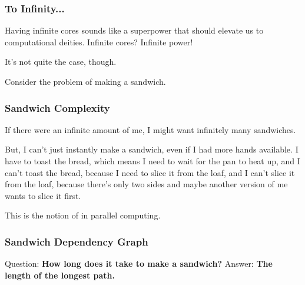 \documentclass[aspectratio=169]{beamer}
\begin{document}
\begin{frame}[fragile]
  \frametitle{To Infinity...}

  Having infinite cores sounds like a superpower that should elevate us to computational deities.
  Infinite cores? Infinite power!

  It's not quite the case, though.

  Consider the problem of making a sandwich.
\end{frame}

\begin{frame}[fragile]
  \frametitle{ Sandwich Complexity }

  If there were an infinite amount of me, I might want infinitely many sandwiches.

  But, I can't just instantly make a sandwich, even if I had more hands available. I have to toast the bread,
  which means I need to wait for the pan to heat up, and I can't toast the bread, because I need to slice it from the
  loaf, and I can't slice it from the loaf, because there's only two sides and maybe another version of me wants to
  slice it first. 


  This is the notion of  in parallel computing.

\end{frame}

  
\begin{frame}[fragile]
  \frametitle{ Sandwich Dependency Graph }


  Question: \textbf{How long does it take to make a sandwich?}
  Answer: \textbf{The length of the longest path.}
\end{frame}
\end{document}
